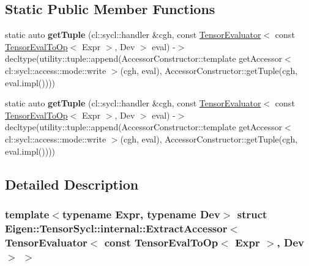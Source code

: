 \subsection*{Static Public Member Functions}
\begin{DoxyCompactItemize}
\item 
\mbox{\label{struct_eigen_1_1_tensor_sycl_1_1internal_1_1_extract_accessor_3_01_tensor_evaluator_3_01const_0198790cf5cfaea7333b9e857f682a074d_aaf33b67ef47b856a9c047e4062460d99}} 
static auto {\bfseries get\+Tuple} (cl\+::sycl\+::handler \&cgh, const \hyperlink{struct_eigen_1_1_tensor_evaluator}{Tensor\+Evaluator}$<$ const \hyperlink{class_eigen_1_1_tensor_eval_to_op}{Tensor\+Eval\+To\+Op}$<$ Expr $>$, Dev $>$ eval) -\/$>$ decltype(utility\+::tuple\+::append(Accessor\+Constructor\+::template get\+Accessor$<$ cl\+::sycl\+::access\+::mode\+::write $>$(cgh, eval), Accessor\+Constructor\+::get\+Tuple(cgh, eval.\+impl())))
\item 
\mbox{\label{struct_eigen_1_1_tensor_sycl_1_1internal_1_1_extract_accessor_3_01_tensor_evaluator_3_01const_0198790cf5cfaea7333b9e857f682a074d_aaf33b67ef47b856a9c047e4062460d99}} 
static auto {\bfseries get\+Tuple} (cl\+::sycl\+::handler \&cgh, const \hyperlink{struct_eigen_1_1_tensor_evaluator}{Tensor\+Evaluator}$<$ const \hyperlink{class_eigen_1_1_tensor_eval_to_op}{Tensor\+Eval\+To\+Op}$<$ Expr $>$, Dev $>$ eval) -\/$>$ decltype(utility\+::tuple\+::append(Accessor\+Constructor\+::template get\+Accessor$<$ cl\+::sycl\+::access\+::mode\+::write $>$(cgh, eval), Accessor\+Constructor\+::get\+Tuple(cgh, eval.\+impl())))
\end{DoxyCompactItemize}


\subsection{Detailed Description}
\subsubsection*{template$<$typename Expr, typename Dev$>$\newline
struct Eigen\+::\+Tensor\+Sycl\+::internal\+::\+Extract\+Accessor$<$ Tensor\+Evaluator$<$ const Tensor\+Eval\+To\+Op$<$ Expr $>$, Dev $>$ $>$}

